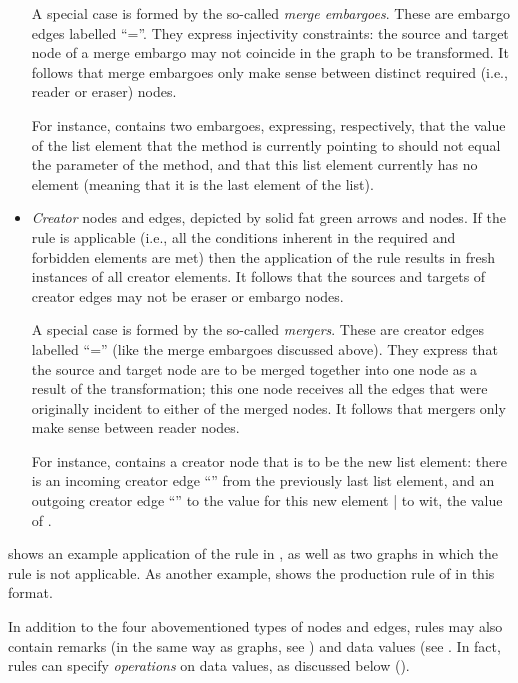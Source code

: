 \begin{itemize}
  A special case is formed by the so-called \emph{merge embargoes}. These are
  embargo edges labelled ``{\sf =}''. They express injectivity constraints: the
  source and target node of a merge embargo may not coincide in the graph to be
  transformed. It follows that merge embargoes only make sense between distinct
  required (i.e., reader or eraser) nodes.
  
  For instance,  contains two embargoes, expressing,
  respectively, that the value of the list element that the \Append{} method is
  currently pointing to should not equal the \xx{} parameter of the method, and
  that this list element currently has no \Next{} element (meaning that it is
  the last element of the list).

\item \emph{Creator} nodes and edges, depicted by solid fat green arrows and
  nodes. If the rule is applicable (i.e., all the conditions inherent in the
  required and forbidden elements are met) then the application of the rule
  results in fresh instances of all creator elements.
  It follows that the sources and targets of creator edges may not be eraser or
  embargo nodes.
  
  A special case is formed by the so-called \emph{mergers}. These are creator
  edges labelled ``{\sf =}'' (like the merge embargoes discussed above). They
  express that the source and target node are to be merged together into one
  node as a result of the transformation; this one node receives all the edges
  that were originally incident to either of the merged nodes. It follows that
  mergers only make sense between reader nodes.
  
  For instance,  contains a creator node that is to be the new list
  element: there is an incoming creator edge ``\Next'' from the previously last
  list element, and an outgoing creator edge ``\Val'' to the value for this new
  element | to wit, the value of \xx{}.
\end{itemize}
%
 shows an example application of the rule in
, as well as two graphs in which the rule is not applicable.
%
%
%
As another example,  shows the production rule of
 in this format.
%

In addition to the four abovementioned types of nodes and edges, rules may also 
contain remarks (in the same way as graphs, see ) and data
values (see . In fact, rules can specify \emph{operations}
on data values, as discussed below ().

